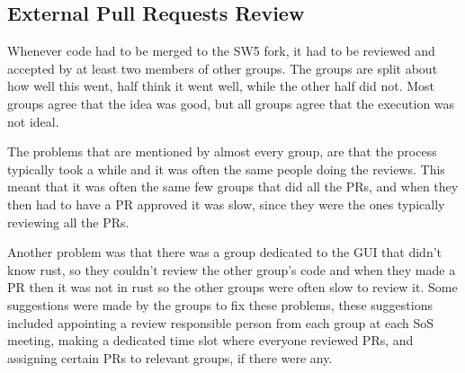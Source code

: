 \subsection{External Pull Requests Review}\label{sec:externalPRreview}
Whenever code had to be merged to the SW5 fork, it had to be reviewed and accepted by at least two members of other groups.
The groups are split about how well this went, half think it went well, while the other half did not.
Most groups agree that the idea was good, but all groups agree that the execution was not ideal.

The problems that are mentioned by almost every group, are that the process typically took a while and it was often the same people doing the reviews.
This meant that it was often the same few groups that did all the PRs, and when they then had to have a PR approved it was slow, since they were the ones typically reviewing all the PRs.

Another problem was that there was a group dedicated to the GUI that didn't know rust, so they couldn't review the other group's code and when they made a PR then it was not in rust so the other groups were often slow to review it.
Some suggestions were made by the groups to fix these problems, these suggestions included appointing a review responsible person from each group at each SoS meeting, making a dedicated time slot where everyone reviewed PRs, and assigning certain PRs to relevant groups, if there were any.

